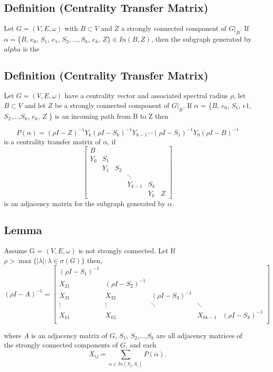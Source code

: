 \documentclass{paper}
\begin{document}
\subsection*{Definition (Centrality Transfer Matrix)}
Let $G = (V,E,\omega)$ with $B \subset V$ and $Z$ a strongly connected component of $G|_{\overline{B}}$. If $\alpha = $\{$B$, $e_0$, $S_1$, $e_1$, $S_2,...,S_k$, $e_k$, $Z$\}$ \in In(B,Z)$, then the subgraph generated by $alpha$ is the 
\subsection*{Definition (Centrality Transfer Matrix)}
Let $G = (V,E,\omega)$ have a centrality vector and associated spectral radius $\rho$, let $B \subset V$ and let $Z$ be a strongly connected component of $G|_B$. If $\alpha$ = \{$B$, $e_0$, $S_1$, $e1$, $S_2$,...,$S_k$, $e_k$, $Z$ \} is an incoming path from B to Z then

\[
P(\alpha) = (\rho I - Z)^{-1}Y_k(\rho I - S_k)^{-1}Y_{k-1}\cdots (\rho I - S_1)^{-1}Y_0(\rho I - B)^{-1}
\]
is a centrality transfer matrix of $\alpha$, if
\[
 \begin{bmatrix}
B \\
Y_0 & S_1 \\
    & Y_1 & S_2 \\
    &     &     & \ddots \\
&&& Y_{k-1} & S_k \\
&&&& Y_k & Z 
\end{bmatrix}
\]
is an adjacency matrix for the subgraph generated by $\alpha$.

\subsection*{Lemma}
Assume G = $(V,E,\omega)$ is not strongly connected. Let If $\rho > \max\{|\lambda| : \lambda \in \sigma(G)\}$ then,
\[
(\rho I - A)^{-1} = 
\begin{bmatrix}
(\rho I - S_1)^{-1} \\
X_{21} & (\rho I - S_2)^{-1} \\
X_{31} & X_{32} & (\rho I - S_3)^{-1} \\
\vdots & \vdots & \ddots & \ddots \\
X_{k1} & X_{k2} & & X_{kk-1} & (\rho I - S_k)^{-1} \\
\end{bmatrix}
\] 

where $A$ is an adjacency matrix of $G$, 
$S_1$, $S_2$,...,$S_k$ are all adjacency matrices of the strongly connected components of $G$, and each 
\[ X_{ij} = \sum_{\alpha \in In(S_j,S_i)} P(\alpha ). \]
\end{document}
